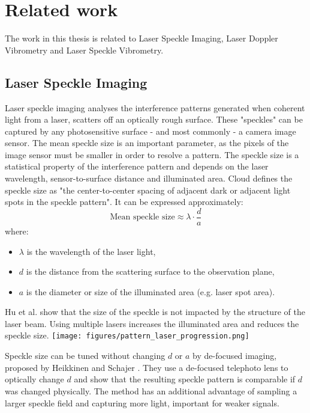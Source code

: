 \section{Related work}
\label{sec:related_work}

The work in this thesis is related to Laser Speckle Imaging, Laser Doppler Vibrometry and Laser Speckle Vibrometry.

\subsection{Laser Speckle Imaging}
Laser speckle imaging analyses the interference patterns generated when coherent light from a laser, scatters off an optically rough surface. These "speckles" can be captured by any photosensitive surface - and most commonly - a camera image sensor. 
The mean speckle size is an important parameter, as the pixels of the image sensor must be smaller in order to resolve a pattern. The speckle size is a statistical property of the interference pattern and depends on the laser wavelength, sensor-to-surface distance and illuminated area. Cloud \cite{specklesize} defines the speckle size as "the center-to-center spacing of adjacent dark or adjacent light spots in the speckle pattern". It can be expressed approximately:
\[
\text{Mean speckle size} \approx \lambda \cdot \frac{d}{a}
\]
where:
\begin{itemize}
    \item \(\lambda\) is the wavelength of the laser light,
    \item \(d\) is the distance from the scattering surface to the observation plane,
    \item \(a\) is the diameter or size of the illuminated area (e.g. laser spot area).
\end{itemize}

Hu et al. \cite{specklesizeANDstructure} show that the size of the speckle is not impacted by the structure of the laser beam. Using multiple lasers increases the illuminated area and reduces the speckle size. \texttt{[image: figures/pattern\_laser\_progression.png]}

Speckle size can be tuned without changing $d$ or $a$ by de-focused imaging, proposed by Heikkinen and Schajer \cite{defocusedVSobjective}. They use a de-focused telephoto lens to optically change $d$ and show that the resulting speckle pattern is comparable if $d$ was changed physically. The method has an additional advantage of sampling a larger speckle field and capturing more light, important for weaker signals.

